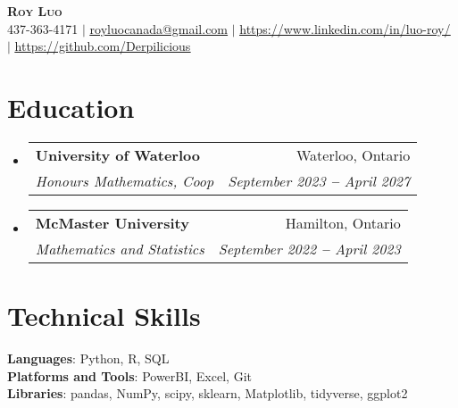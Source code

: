 \documentclass[letterpaper,11pt]{article}
\makeatletter
\newcommand{\resumeSubheading}[4]{
  \vspace{-2pt}\item
    \begin{tabular*}{0.97\textwidth}[t]{l@{\extracolsep{\fill}}r}
      \textbf{#1} & #2 \\
      \textit{\small#3} & \textit{\small #4} \\
    \end{tabular*}\vspace{-7pt}
}
\newcommand{\resumeSubHeadingListStart}{\begin{itemize}[leftmargin=0.15in, label={}]}
\newcommand{\resumeSubHeadingListEnd}{\end{itemize}}
\makeatother
\begin{document}

\begin{center}
    \textbf{\Huge \scshape Roy Luo} \\ \vspace{1pt}
    \small 437-363-4171 $|$ \href{mailto:royluocanada@gmail.com}{\underline{royluocanada@gmail.com}} $|$ 
    \href{https://linkedin.com/in/luo-roy/}{\underline{https://www.linkedin.com/in/luo-roy/}} $|$
    \href{https://github.com/Derpilicious}{\underline{https://github.com/Derpilicious}}
\end{center}
 
\section{Education}
  \resumeSubHeadingListStart
    \resumeSubheading
      {University of Waterloo}{Waterloo, Ontario}
      {Honours Mathematics, Coop}{September 2023 \textbf{--} April 2027}
    \resumeSubheading
      {McMaster University}{Hamilton, Ontario}
      {Mathematics and Statistics}{September 2022 \textbf{--} April 2023}
\resumeSubHeadingListEnd
      
\section{Technical Skills}
\begin{itemize}[leftmargin=0.15in, label={}]
   \small{\item{
    \textbf{Languages}{: Python, R, SQL} \\
    \textbf{Platforms and Tools}{: PowerBI, Excel, Git} \\
    \textbf{Libraries}{: pandas, NumPy, scipy, sklearn, Matplotlib, tidyverse, ggplot2} \\
   }}
 \end{itemize}
\end{document}
